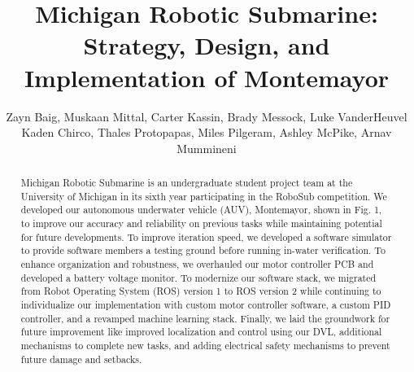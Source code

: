 \documentclass[conference]{IEEEtran}
\begin{document}
\title{Michigan Robotic Submarine: Strategy, Design, and Implementation of Montemayor}
\author{
Zayn Baig, Muskaan Mittal, Carter Kassin, Brady Messock, Luke VanderHeuvel %
\\ 
Kaden Chirco, Thales Protopapas, Miles Pilgeram, Ashley McPike, Arnav Mummineni %
}

%
%

\maketitle
\pagestyle{fancy}
\rhead{\thepage}

\begin{abstract}
Michigan Robotic Submarine is an undergraduate student project team at the University of Michigan in its sixth year participating in the RoboSub competition. We developed our autonomous underwater vehicle (AUV), Montemayor, shown in Fig. 1, to improve our accuracy and reliability on previous tasks while maintaining potential for future developments. To improve iteration speed, we developed a software simulator to provide software members a testing ground before running in-water verification. To enhance organization and robustness, we overhauled our motor controller PCB and developed a battery voltage monitor. To modernize our software stack, we migrated from Robot Operating System (ROS) version 1 to ROS version 2 while continuing to individualize our implementation with custom motor controller software, a custom PID controller, and a revamped machine learning stack. Finally, we laid the groundwork for future improvement like improved localization and control using our DVL, additional mechanisms to complete new tasks, and adding electrical safety mechanisms to prevent future damage and setbacks.


\end{abstract}
\end{document}

